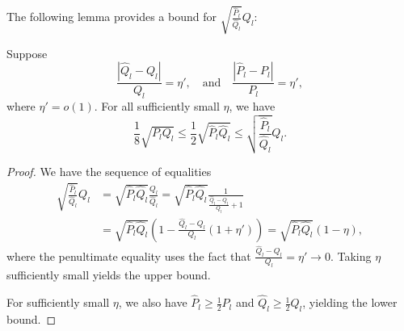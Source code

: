 \documentclass{article}
\begin{document}
The following lemma provides a bound for $\sqrt{ \frac{\hat{P}_l}{\hat{Q}_l} } Q_l$:
\begin{lemma}
\label{lem:sqrt_ratio_times_ql}
Suppose
\[
\frac{|\hat{Q}_l - Q_l|}{Q_l} = \eta', \quad \text{and} \quad \frac{|\hat{P}_l - P_l|}{P_l} = \eta',
\]
where $\eta' = o(1)$. For all sufficiently small $\eta$, we have
\[
  \frac{1}{8} \sqrt{P_l Q_l} \le \frac{1}{2} \sqrt{\hat{P}_l \hat{Q}_l} \le \sqrt{ \frac{\hat{P}_l}{\hat{Q}_l} } Q_l.
\]
\end{lemma}


\begin{proof}
We have the sequence of equalities
\begin{align*}
\sqrt{\frac{\hat{P}_l}{\hat{Q}_l} } Q_l  &= \sqrt{ \hat{P}_l \hat{Q}_l} \frac{Q_l}{\hat{Q}_l} = \sqrt{\hat{P}_l \hat{Q}_l} \frac{1}{ \frac{\hat Q_l - {Q}_l}{Q_l} + 1 } \\
&= \sqrt{\hat{P}_l \hat{Q}_l} 
  \left( 1 - \frac{\hat{Q}_l - Q_l}{Q_l} (1 + \eta') \right) = \sqrt{\hat{P}_l \hat{Q}_l} (1 - \eta),
\end{align*}
where the penultimate equality uses the fact that $\frac{\hat{Q}_l - Q_l}{Q_l} = \eta' \rightarrow 0$. Taking $\eta$ sufficiently small yields the upper bound.

For sufficiently small $\eta$, we also have $\hat{P}_l \geq \frac{1}{2} P_l$ and $\hat{Q}_l \geq \frac{1}{2} Q_l$, yielding the lower bound.
\end{proof}
\end{document}
